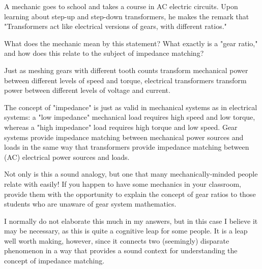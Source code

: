 

A mechanic goes to school and takes a course in AC electric circuits.  Upon learning about step-up and step-down transformers, he makes the remark that "Transformers act like electrical versions of gears, with different ratios."  

What does the mechanic mean by this statement?  What exactly is a "gear ratio," and how does this relate to the subject of impedance matching?







Just as meshing gears with different tooth counts transform mechanical power between different levels of speed and torque, electrical transformers transform power between different levels of voltage and current.  

The concept of "impedance" is just as valid in mechanical systems as in electrical systems: a "low impedance" mechanical load requires high speed and low torque, whereas a "high impedance" load requires high torque and low speed.  Gear systems provide impedance matching between mechanical power sources and loads in the same way that transformers provide impedance matching between (AC) electrical power sources and loads.







Not only is this a sound analogy, but one that many mechanically-minded people relate with easily!  If you happen to have some mechanics in your classroom, provide them with the opportunity to explain the concept of gear ratios to those students who are unaware of gear system mathematics.

I normally do not elaborate this much in my answers, but in this case I believe it may be necessary, as this is quite a cognitive leap for some people.  It is a leap well worth making, however, since it connects two (seemingly) disparate phenomenon in a way that provides a sound context for understanding the concept of impedance matching.



